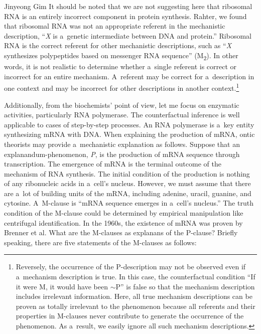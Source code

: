 \begin{artengenv}{Jinyeong Gim}
It should be noted that we are not suggesting here that ribosomal RNA is an entirely incorrect component in protein synthesis. Rahter, we found that ribosomal RNA was not an appropriate referent in the mechanistic description, ``\textit{X} is a~genetic intermediate between DNA and protein.'' Ribosomal RNA is the correct referent for other mechanistic descriptions, such as ``\textit{X} synthesizes polypeptides based on messenger RNA sequence'' (M\textsubscript{2}). In other words, it is not realistic to determine whether a~single referent is correct or incorrect for an entire mechanism. A~referent may be correct for a~description in one context and may be incorrect for other descriptions in another context.\footnote{Reversely, the occurrence of the P-description may not be observed even if a~mechanism description is true. In this case, the counterfactual condition ``If it were M, it would have been $\sim$P'' is false so that the mechanism description includes irrelevant information. Here, all true mechanism descriptions can be proven as totally irrelevant to the phenomenon because all referents and their properties in M-clauses never contribute to generate the occurrence of the phenomenon. As a~result, we easily ignore all such mechanism descriptions.}

Additionally, from the biochemists' point of view, let me focus on enzymatic activities, particularly RNA polymerase. The counterfactual inference is well applicable to cases of step-by-step processes. An RNA polymerase is a~key entity synthesizing mRNA with DNA. When explaining the production of mRNA, ontic theorists may provide a~mechanistic explanation as follows. Suppose that an explanandum-phenomenon, \textit{P}, is the production of mRNA sequence through transcription. The emergence of mRNA is the terminal outcome of the mechanism of RNA synthesis. The initial condition of the production is nothing of any ribonucleic acids in a~cell's nucleus. However, we must assume that there are a~lot of building units of the mRNA, including adenine, uracil, guanine, and cytosine. A~M-clause is ``mRNA sequence emerges in a~cell's nucleus.'' The truth condition of the M-clause could be determined by empirical manipulation like centrifugal identification. In the 1960s, the existence of mRNA was proven by Brenner et al. What are the M-clauses as explanans of the P-clause? Briefly speaking, there are five statements of the M-clauses as follows:


\end{artengenv}
